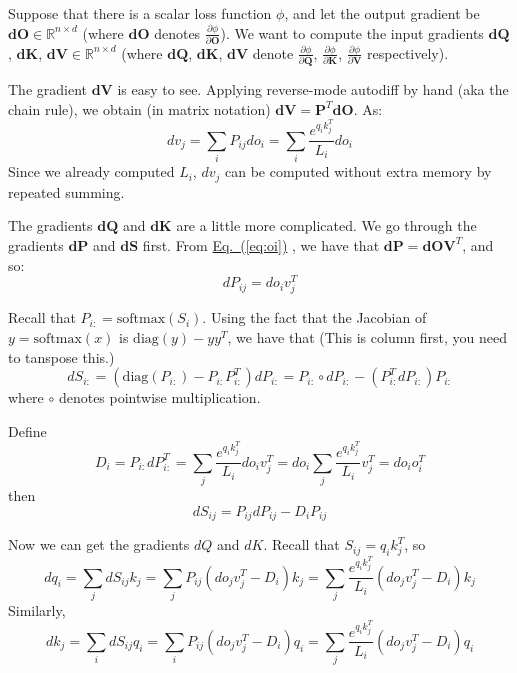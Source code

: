 \documentclass{article}
\newcommand{\redbox}[1]{%
  \colorbox{red!20}{\hyperref[#1]{Eq.~(\ref*{#1})}}%
}
\begin{document}
Suppose that there is a scalar loss function $\phi$, and let the output gradient be $\mathbf{dO} \in \mathbb{R}^{n \times d}$ (where $\mathbf{dO}$ denotes $\frac{\partial \phi}{\partial \mathbf{O}}$). We want to compute the input gradients $\mathbf{dQ}$, $\mathbf{dK}$, $\mathbf{dV} \in \mathbb{R}^{n \times d}$ (where $\mathbf{dQ}$, $\mathbf{dK}$, $\mathbf{dV}$ denote $\frac{\partial \phi}{\partial \mathbf{Q}}$, $\frac{\partial \phi}{\partial \mathbf{K}}$, $\frac{\partial \phi}{\partial \mathbf{V}}$ respectively).

The gradient $\mathbf{dV}$ is easy to see. Applying reverse-mode autodiff by hand (aka the chain rule), we obtain (in matrix notation) $\mathbf{dV} = \mathbf{P}^T \mathbf{dO}$. As:
\begin{equation}
    dv_j = \sum_i P_{ij} do_i = \sum_i \frac{e^{q_i k_j^T}}{L_i}do_i \label{eq:dvj}
\end{equation}
Since we already computed ${L_i}$, $dv_j$ can be computed without extra memory by repeated summing.

The gradients $\mathbf{dQ}$ and $\mathbf{dK}$ are a little more complicated. We go through the gradients $\mathbf{dP}$ and $\mathbf{dS}$ first. From \redbox{eq:oi}, we have that $\mathbf{dP} = \mathbf{dO} \mathbf{V}^T$, and so:
\begin{equation}
    dP_{ij} = do_i v_j^T
\end{equation}

Recall that $P_{i:} = \mathrm{softmax}(S_i)$. Using the fact that the Jacobian of $y = \mathrm{softmax}(x)$ is $\mathrm{diag}(y) - yy^T$, we have that (This is column first, you need to tanspose this.)
\begin{equation}
    dS_{i:} = (\mathrm{diag}(P_{i:}) - P_{i:} P_{i:}^T) dP_{i:}=P_{i:} \circ dP_{i:} - (P_{i:}^T dP_{i:}) P_{i:}
\end{equation}
where $\circ$ denotes pointwise multiplication.

Define
\begin{equation}
    D_i = P_{i:} dP_{i:}^T = \sum_j \frac{e^{q_i k_j^T}}{L_i} do_i v_j^T = do_i \sum_j \frac{e^{q_i k_j^T}}{L_i} v_j^T = do_i o_i^T \label{eq:dd}
\end{equation}
then
\begin{equation}
    dS_{ij} = P_{ij} dP_{ij} - D_i P_{ij}
\end{equation}

Now we can get the gradients $dQ$ and $dK$. Recall that $S_{ij} = q_i k_j^T$, so
\begin{equation}
    dq_i = \sum_j dS_{ij} k_j = \sum_j P_{ij} ( do_j v_j^T - D_i) k_j = \sum_j \frac{e^{q_i k_j^T}}{L_i} ( do_j v_j^T - D_i) k_j  \label{eq:dq}
\end{equation}
Similarly,
\begin{equation}
    dk_j = \sum_i dS_{ij} q_i = \sum_i P_{ij} ( do_j v_j^T - D_i) q_i = \sum_j \frac{e^{q_i k_j^T}}{L_i} ( do_j v_j^T - D_i) q_i \label{eq:dk}
\end{equation}
\end{document}
